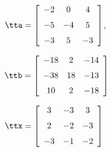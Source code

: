 {$\tta = \left[ \begin {array}{ccc} -2&0&4 \\ \noalign{\medskip} -5&-4&5 \\ \noalign{\medskip} -3&5&-3\end {array} \right] $, 

$\ttb=\left[ \begin {array}{ccc} -18&2&-14\\ \noalign{\medskip} -38&18&-13 \\ \noalign{\medskip} 10&2&-18  \end {array} \right] $}
{$\ttx=\left[ \begin {array}{ccc} 3&-3&3\\ \noalign{\medskip} 2&-2&-3 \\ \noalign{\medskip} -3&-1&-2  \end {array} \right] $}
